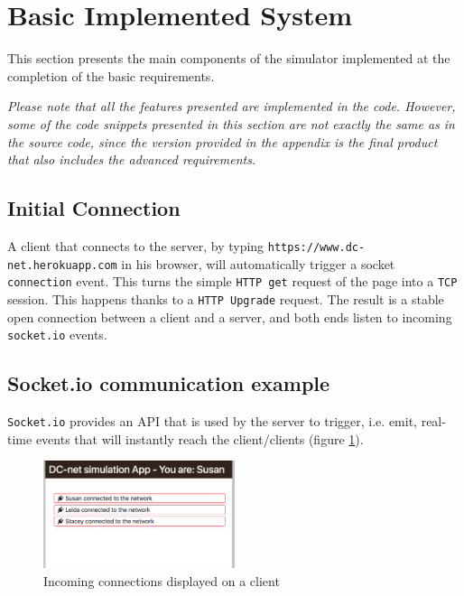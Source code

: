 \section{Basic Implemented System}
This section presents the main components of the simulator implemented at the completion of the basic requirements. 

\emph{Please note that all the features presented are implemented in the code. However, some of the code snippets presented in this section are not exactly the same as in the source code, since the version provided in the appendix is the final product that also includes the advanced requirements.}

\subsection{Initial Connection} \label{sec:initialConnection}
A client that connects to the server, by typing \lstinline{https://www.dc-net.herokuapp.com} in his browser, will automatically trigger a socket \lstinline{connection} event. This turns the simple \lstinline{HTTP get} request of the page into a \lstinline{TCP} session. This happens thanks to a \lstinline{HTTP Upgrade} request. The result is a stable open connection between a client and a server, and both ends listen to incoming \lstinline{socket.io} events.


\subsection{Socket.io communication example}
\lstinline{Socket.io} provides an API that is used by the server to trigger, i.e. emit, real-time events that will instantly reach the client/clients (figure \ref{fig:incomingConnection}). 

\begin{figure}[H]
    \centering
    \includegraphics[width=0.5\textwidth]{Images/Implementation/incomingConnections.png}
    \caption{Incoming connections displayed on a client}
    \label{fig:incomingConnection}
\end{figure}

